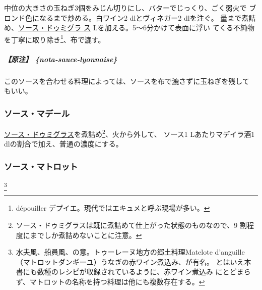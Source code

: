 \begin{recette}


中位の大きさの玉ねぎ3個をみじん切りにし、バターでじっくり、ごく弱火で
ブロンド色になるまで炒める。白ワイン2 dlとヴィネガー2 dlを注ぐ。
\untiers{}量まで煮詰め、\protect\hyperlink{sauce-demi-glace}{ソース・ドゥミグラ
ス}\troisquarts{} Lを加える。5〜6分かけて表面に浮い
てくる不純物を丁寧に取り除き\footnote{dépouiller
  デプイエ。現代ではエキュメと呼ぶ現場が多い。}、布で漉す。

\hypertarget{ux539fux6ce8-nota-sauce-lyonnaise}{%
\subparagraph{【原注】
\{nota-sauce-lyonnaise\}}\label{ux539fux6ce8-nota-sauce-lyonnaise}}

このソースを合わせる料理によっては、ソースを布で漉さずに玉ねぎを残して
もいい。

\hypertarget{sauce-madere}{%
\subsubsection{ソース・マデール}\label{sauce-madere}}



\protect\hyperlink{sauce-demi-glace}{ソース・ドゥミグラス}を煮詰め\footnote{ソース・ドゥミグラスは既に煮詰めて仕上がった状態のものなので、9
  割程度にまでしか煮詰めないことに注意。}、火から外して、 ソース1
Lあたりマデイラ酒1 dlの割合で加え、普通の濃度にする。

\hypertarget{sauce-matelote}{%
\subsubsection{ソース・マトロット}\label{sauce-matelote}}

\footnote{水夫風、船員風、の意。トゥーレーヌ地方の郷土料理Matelote
  d'anguille（マトロットダンギーユ）うなぎの赤ワイン煮込み、が有名。
  とはいえ本書にも数種のレシピが収録されているように、赤ワイン煮込み
  にとどまらず、マトロットの名称を持つ料理は他にも複数存在する。}


\end{recette}
